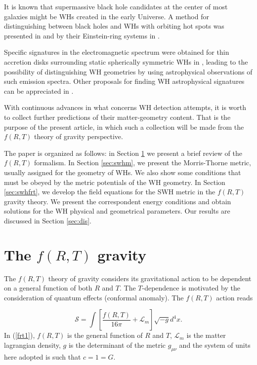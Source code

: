 \documentclass[aps,preprint,onecolumn,11pt,showkeys]{revtex4}%
\begin{document}
It is known that supermassive black hole candidates at the center of most
galaxies might be WHs created in the early Universe. A method for
distinguishing between black holes and WHs with orbiting hot spots was
presented in \cite{li/2014} and by their Einstein-ring systems in
\cite{tsukamoto/2012}.

Specific signatures in the electromagnetic spectrum were obtained for thin
accretion disks surrounding static spherically symmetric WHs in
\cite{bambi/2013,harko/2009,harko/2008}, leading to the possibility of
distinguishing WH geometries by using astrophysical observations of such
emission spectra. Other proposals for finding WH astrophysical signatures can
be appreciated in \cite{safonova/2002,safonova/2001,torres/1998,cramer/1995}.

With continuous advances in what concerns WH detection attempts, it is worth
to collect further predictions of their matter-geometry content. That is the
purpose of the present article, in which such a collection will be made from
the $f(R,T)$ theory of gravity perspective.

The paper is organized as follows: in Section \ref{sec:frt} we present a brief
review of the $f(R,T)$ formalism. In Section \ref{sec:swhm}, we present the
Morris-Thorne metric, usually assigned for the geometry of WHs. We also show
some conditions that must be obeyed by the metric potentials of the WH
geometry. In Section \ref{sec:swhfrt}, we develop the field equations for the
SWH metric in the $f(R,T)$ gravity theory. We present the correspondent energy conditions and obtain solutions for the WH physical and geometrical parameters. Our
results are discussed in Section \ref{sec:dis}.

\section{The $f(R,T)$ gravity}

\label{sec:frt}

The $f(R,T)$ theory of gravity considers its gravitational action to be
dependent on a general function of both $R$ and $T$. The $T$-dependence is
motivated by the consideration of quantum effects (conformal anomaly). The
$f(R,T)$ action reads%

\begin{equation}
\label{frt1}\mathcal{S}=\int\left[  \frac{f(R,T)}{16\pi}+\mathcal{L}%
_{m}\right]  \sqrt{-g}d^{4}x.
\end{equation}
In (\ref{frt1}), $f(R,T)$ is the general function of $R$ and $T$,
$\mathcal{L}_{m}$ is the matter lagrangian density, $g$ is the determinant of
the metric $g_{\mu\nu}$ and the system of units here adopted is such that
$c=1=G$.
\end{document}
